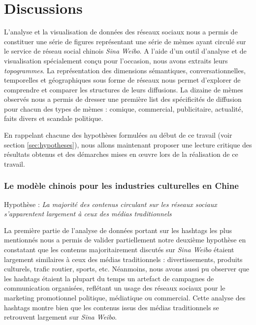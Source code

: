 \section[Discussions]{Discussions}



L{\textquoteright}analyse et la visualisation de données des réseaux  sociaux nous a permis de constituer une série de figures représentant une série de mèmes ayant circulé sur le service de réseau social chinois \textit{Sina Weibo}. A l{\textquoteright}aide d{\textquoteright}un outil d{\textquoteright}analyse et de visualisation spécialement con\c{c}u pour l{\textquoteright}occasion, nous avons extraits leurs \textit{topogrammes}. La représentation des dimensions sémantiques, conversationnelles, temporelles et géographiques sous forme de réseaux nous permet d'explorer de comprendre et comparer les structures de leurs diffusions. La dizaine de mèmes observés nous a permis de dresser une première list des spécificités de diffusion pour chacun des types de mèmes : comique, commercial, publicitaire, actualité, faits divers et scandale politique.

En rappelant chacune des hypothèses formulées au début de ce travail (voir section \ref{sec:hypotheses}), nous allons maintenant proposer une lecture critique des résultats obtenus et des démarches mises en œuvre lors de la réalisation de ce travail. 

\subsubsection{Le modèle chinois pour les industries culturelles en Chine} 

Hypothèse : \textit{La majorité des contenus circulant sur les réseaux sociaux s'apparentent largement à ceux des médias traditionnels} 

La première partie de l{\textquoteright}analyse de données portant sur les hashtags les plus mentionnés nous a permis de valider partiellement notre deuxième hypothèse en constatant que les contenus majoritairement discutés sur \textit{Sina Weibo} étaient largement similaires à ceux des médias traditionnels : divertissements, produits culturels, trafic routier, sports, etc. Néanmoins, nous avons aussi pu observer que les hashtags étaient la plupart du temps un artefact de campagnes de communication organisées, reflétant un usage des réseaux sociaux pour le marketing promotionnel politique, médiatique ou commercial. Cette analyse des hashtags montre bien que les contenus issus des médias traditionnels se retrouvent largement sur \textit{Sina Weibo}.


